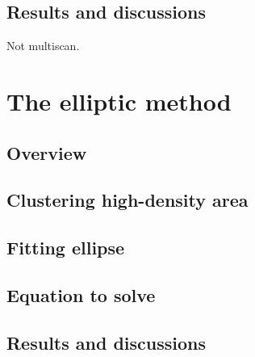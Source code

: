 \subsection{Results and discussions}
Not multiscan.


\section{The elliptic method}
\label{sc:elliptic}

\subsection{Overview}


\subsection{Clustering high-density area}


\subsection{Fitting ellipse}


\subsection{Equation to solve}


\subsection{Results and discussions}
